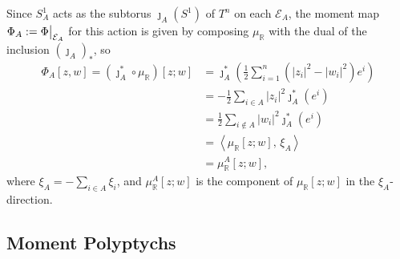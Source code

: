 \documentclass{article}
\newcommand{\RR}{\mathbb{R}}
\newcommand{\mcE}{\mathcal{E}}
\newcommand\restr[2]{{%
		\left.\kern-\nulldelimiterspace %
		#1 %
		\vphantom{\big|} %
		\right|_{#2} %
}}
\begin{document}
	Since $S_{A}^{1}$ acts as the subtorus $\jmath_{A}(S^{1})$ of $T^{n}$ on each $\mcE_{A}$, the moment map $\Phi_{A} := \restr{\Phi}{\mcE_{A}}$ for this action is given by composing $\mu_{\RR}$ with the dual of the inclusion $(\jmath_{A})_{\ast}$, so
	\[
	\begin{split}
		\Phi_{A}[z,w] = \left( \jmath_{A}^{\ast} \circ \mu_{\RR} \right)[z;w] &= \jmath_{A}^{\ast} \left( \frac{1}{2} \sum_{i = 1}^{n} \left( |z_{i}|^{2} - |w_{i}|^{2} \right) e^{i} \right) \\
		&= -\frac{1}{2} \sum_{i \in A} |z_{i}|^{2} \jmath_{A}^{\ast}(e^{i}) \\
		&= \frac{1}{2} \sum_{i \not\in A} |w_{i}|^{2} \jmath_{A}^{\ast}(e^{i}) \\
		&= \left\langle \mu_{\RR}[z;w],\, \xi_{A} \right\rangle \\
		&= \mu_{\RR}^{A}[z;w],
	\end{split}
	\]
	where $\xi_{A} = -\sum_{i \in A} \xi_{i}$, and $\mu_{\RR}^{A}[z;w]$ is the component of $\mu_{\RR}[z;w]$ in the $\xi_{A}$-direction.
	
	\subsection{Moment Polyptychs}
	
	
	
	
	
	
	  
	
	
\end{document}
